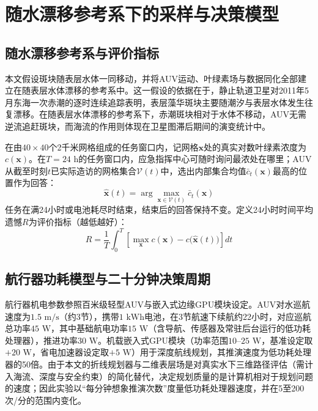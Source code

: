 \section{随水漂移参考系下的采样与决策模型}

\subsection{随水漂移参考系与评价指标}

本文假设斑块随表层水体一同移动，并将AUV运动、叶绿素场与数据同化全部建立在随表层水体漂移的参考系中。这一假设的依据在于，静止轨道卫星对2011年5月东海一次赤潮的逐时连续追踪表明，表层藻华斑块主要随潮汐与表层水体发生往复漂移\cite{lou2014diurnal}。在随表层水体漂移的参考系下，赤潮斑块相对于水体不移动，AUV无需逆流追赶斑块，而海流的作用则体现在卫星图滞后期间的演变统计中。

在由$40\times 40$个2千米网格组成的任务窗口内，记网格$\mathbf{x}$处的真实对数叶绿素浓度为$c(\mathbf{x})$。在$T=24\text{ h}$的任务窗口内，应急指挥中心可随时询问最浓处在哪里；AUV从截至时刻$t$已实际造访的网格集合$\mathcal{V}(t)$中，选出内部集合均值$\bar{c}_t(\mathbf{x})$最高的位置作为回答：
\begin{equation}
  \hat{\mathbf{x}}(t) = \arg\max_{\mathbf{x}\in\mathcal{V}(t)} \bar{c}_t(\mathbf{x})
  \label{eq:answer}
\end{equation}
任务在满24小时或电池耗尽时结束，结束后的回答保持不变。定义24小时时间平均遗憾$R$为评价指标（越低越好）：
\begin{equation}
  R = \frac{1}{T}\int_0^T \left[\max_{\mathbf{x}} c(\mathbf{x}) - c\big(\hat{\mathbf{x}}(t)\big)\right] dt
  \label{eq:regret}
\end{equation}

\subsection{航行器功耗模型与二十分钟决策周期}

航行器机电参数参照百米级轻型AUV\cite{remus100}与嵌入式边缘GPU模块\cite{jetsonorinnx}设定。AUV对水巡航速度为$1.5\text{ m/s}$（约3节），携带$1\text{ kWh}$电池，在3节航速下续航约22小时，对应巡航总功率$45\text{ W}$，其中基础航电功率$15\text{ W}$（含导航、传感器及常驻后台运行的低功耗处理器），推进功率$30\text{ W}$。机载嵌入式GPU模块（功率范围$10\text{--}25\text{ W}$，基准设定取$+20\text{ W}$，省电加速器设定取$+5\text{ W}$）用于深度航线规划，其推演速度为低功耗处理器的50倍。由于本文的折线规划器与二维表层场是对真实水下三维路径评估（需计入海流、深度与安全约束）的简化替代，决定规划质量的是计算机相对于规划问题的速度；因此实验以“每分钟想象推演次数”度量低功耗处理器速度，并在5至200次/分的范围内变化。

